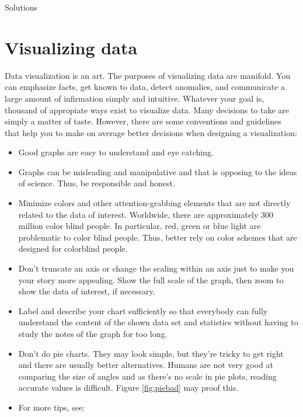 \documentclass[
  12pt,
  oneside]{book}
\providecommand{\tightlist}{%
  \setlength{\itemsep}{0pt}\setlength{\parskip}{0pt}}
\theoremstyle{definition}
\theoremstyle{definition}
\theoremstyle{definition}
\theoremstyle{definition}
\theoremstyle{remark}
\begin{document}
Solutions

\hypertarget{visualizing-data}{%
\chapter{Visualizing data}\label{visualizing-data}}

Data visualization is an art. The purposes of visualizing data are manifold. You can emphasize facts, get known to data, detect anomalies, and communicate a large amount of infirmation simply and intuitive. Whatever your goal is, thousand of appropiate ways exist to visualize data. Many decisions to take are simply a matter of taste. However, there are some conventions and guidelines that help you to make on average better decisions when designing a visualization:

\begin{itemize}
\tightlist
\item
  Good graphs are easy to understand and eye catching.
\item
  Graphs can be misleading and manipulative and that is opposing to the ideas of science. Thus, be responsible and honest.
\item
  Minimize colors and other attention-grabbing elements that are not directly related to the data of interest. Worldwide, there are approximately 300 million color blind people. In particular, red, green or blue light are problematic to color blind people. Thus, better rely on color schemes that are designed for colorblind people.
\item
  Don't truncate an axis or change the scaling within an axis just to make you your story more appealing. Show the full scale of the graph, then zoom to show the data of interest, if necessary.
\item
  Label and describe your chart sufficiently so that everybody can fully understand the content of the shown data set and statistics without having to study the notes of the graph for too long.
\item
  Don't do pie charts. They may look simple, but they're tricky to get right and there are usually better alternatives. Humans are not very good at comparing the size of angles and as there's no scale in pie plots, reading accurate values is difficult. Figure \ref{fig:piebad} may proof this.
\item
  For more tips, see:


\end{itemize}
\end{document}
